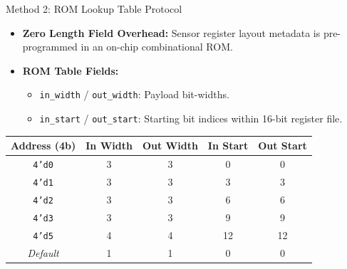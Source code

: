 \documentclass{beamer}
\begin{document}
\begin{frame}{Method 2: ROM Lookup Table Protocol}
  \begin{itemize}
    \item \textbf{Zero Length Field Overhead:} Sensor register layout metadata is pre-programmed in an on-chip combinational ROM.
    \item \textbf{ROM Table Fields:}
    \begin{itemize}
      \item \texttt{in\_width} / \texttt{out\_width}: Payload bit-widths.
      \item \texttt{in\_start} / \texttt{out\_start}: Starting bit indices within 16-bit register file.
    \end{itemize}
  \end{itemize}
  \begin{table}
    \centering\tiny
    \begin{tabular}{ccccc}
      \toprule
      \textbf{Address (4b)} & \textbf{In Width} & \textbf{Out Width} & \textbf{In Start} & \textbf{Out Start} \\
      \midrule
      \texttt{4'd0} & 3 & 3 & 0 & 0 \\
      \texttt{4'd1} & 3 & 3 & 3 & 3 \\
      \texttt{4'd2} & 3 & 3 & 6 & 6 \\
      \texttt{4'd3} & 3 & 3 & 9 & 9 \\
      \texttt{4'd5} & 4 & 4 & 12 & 12 \\
      \textit{Default} & 1 & 1 & 0 & 0 \\
      \bottomrule
    \end{tabular}
  \end{table}
\end{frame}
\end{document}
